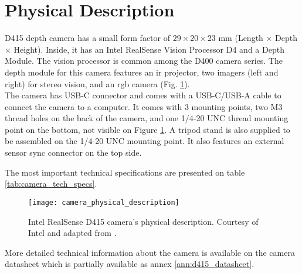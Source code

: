 \section{Physical Description}
\label{sec:vision_system_physical_description}

D415 depth camera has a small form factor of $29 \times 20 \times 23$ \si{\milli\meter} (Length $\times$ Depth $\times$ Height). Inside, it has an Intel\textregistered{} RealSense\texttrademark{} Vision Processor D4 and a Depth Module. The vision processor is common among the D400 camera series. The depth module for this camera features an \gls{ir} projector, two imagers (left and right) for stereo vision, and an \gls{rgb} camera (Fig. \ref{fig:camera_physical_description}).\\

The camera has USB-C connector and comes with a USB-C/USB-A cable to connect the camera to a computer. It comes with 3 mounting points, two M3 thread holes on the back of the camera, and one 1/4‑20 UNC thread mounting point on the bottom, not visible on Figure \ref{fig:camera_physical_description}. A tripod stand is also supplied to be assembled on the 1/4-20 UNC mounting point. It also features an external sensor sync connector on the top side.

The most important technical specifications are presented on table \ref{tab:camera_tech_specs}.\\

\begin{figure}[htbp]
	\centering
	\texttt{[image: camera\_physical\_description]}
	\caption{Intel\textregistered{} RealSense\texttrademark{} D415 camera's physical description. Courtesy of Intel\textregistered{} and adapted from \cite{IntelRealSense_depth_camera_d415}.}
	\label{fig:camera_physical_description}
\end{figure}

More detailed technical information about the camera is available on the camera datasheet which is partially available as annex \ref{ann:d415_datasheet}.

